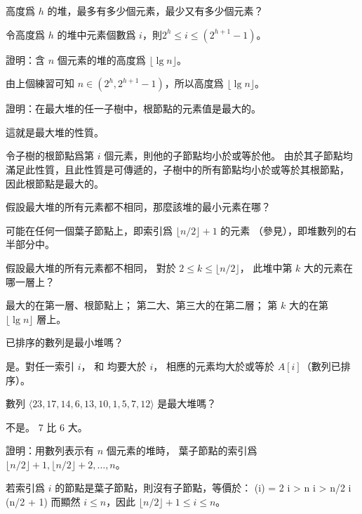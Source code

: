 \startsection[
  reference=section:heaps,
  title={Heaps},
]

\startEXERCISE
高度爲 $h$ 的堆，最多有多少個元素，最少又有多少個元素？
\stopEXERCISE

\startANSWER
令高度爲 $h$ 的堆中元素個數爲 $i$，則$2^h \le i \le (2^{h+1} - 1)$。
\stopANSWER

證明：含 $n$ 個元素的堆的高度爲 $\lfloor \lg{n} \rfloor$。
\stopEXERCISE

\startANSWER
由上個練習可知 $n \in (2^h, 2^{h+1} - 1)$，所以高度爲 $\lfloor \lg{n} \rfloor$。
\stopANSWER

\startEXERCISE
證明：在最大堆的任一子樹中，根節點的元素值是最大的。
\stopEXERCISE

\startANSWER
這就是最大堆的性質。

令子樹的根節點爲第 $i$ 個元素，則他的子節點均小於或等於他。
由於其子節點均滿足此性質，且此性質是可傳遞的，子樹中的所有節點均小於或等於其根節點，
因此根節點是最大的。
\stopANSWER

\startEXERCISE
假設最大堆的所有元素都不相同，那麼該堆的最小元素在哪？
\stopEXERCISE

\startANSWER
可能在任何一個葉子節點上，即索引爲 $\lfloor n/2 \rfloor + 1$ 的元素
（參見），即堆數列的右半部分中。
\stopANSWER

\startEXERCISE
假設最大堆的所有元素都不相同，
對於 $2\le k\le \lfloor n/2\rfloor$，
此堆中第 $k$ 大的元素在哪一層上？
\stopEXERCISE

\startANSWER
最大的在第一層、根節點上；
第二大、第三大的在第二層；
第 $k$ 大的在第 $\lfloor \lg n\rfloor$ 層上。
\stopANSWER

\startEXERCISE
已排序的數列是最小堆嗎？
\stopEXERCISE

\startANSWER
是。對任一索引 $i$，  和  均要大於 $i$，
相應的元素均大於或等於 $A[i]$（數列已排序）。
\stopANSWER

\startEXERCISE
數列 $\langle 23, 17, 14, 6, 13, 10, 1, 5, 7, 12 \rangle$ 是最大堆嗎？
\stopEXERCISE

\startANSWER
不是。 $7$ 比 $6$ 大。

\externalfigure[e6_1_6-1]

\stopANSWER

證明：用數列表示有 $n$ 個元素的堆時，
葉子節點的索引爲 $\lfloor n/2 \rfloor + 1,\lfloor n/2 \rfloor + 2, \ldots, n$。
\stopEXERCISE

\startANSWER
若索引爲 $i$ 的節點是葉子節點，則沒有子節點，等價於：
\startsplitformula\startmathalignment[n=1]
\NC {}(i) = 2 i > n \NR
\NC i > n/2 \NR
\NC i \ge (\lfloor n/2 \rfloor + 1) \NR
\stopmathalignment\stopsplitformula
而顯然 $i\le n$，因此 $\lfloor n/2 \rfloor + 1 \le i\le n$。
\stopANSWER

\stopsection%
